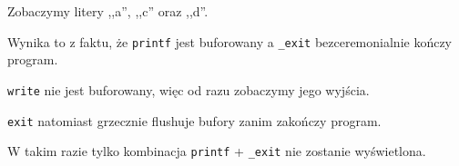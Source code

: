 Zobaczymy litery ,,a'', ,,c'' oraz ,,d''.

Wynika to z faktu, że \texttt{printf} jest buforowany a \texttt{\_exit} bezceremonialnie kończy program.

\texttt{write} nie jest buforowany, więc od razu zobaczymy jego wyjścia.

\texttt{exit} natomiast grzecznie flushuje bufory zanim zakończy program.

W takim razie tylko kombinacja \texttt{printf} + \texttt{\_exit} nie zostanie wyświetlona.